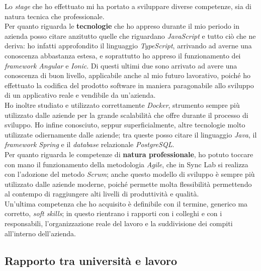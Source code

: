 Lo \textit{stage} che ho effettuato mi ha portato a sviluppare diverse competenze, sia di natura tecnica che professionale. \\
Per quanto riguarda le \textbf{tecnologie} che ho appreso durante il mio periodo in azienda posso citare anzitutto quelle che riguardano \textit{JavaScript} e tutto ciò che ne deriva: ho infatti approfondito il linguaggio \textit{TypeScript}, arrivando ad averne una conoscenza abbastanza estesa, e  soprattutto ho appreso il funzionamento dei \textit{framework Angular} e \textit{Ionic}. Di questi ultimi due sono arrivato ad avere una conoscenza di buon livello, applicabile anche al mio futuro lavorativo, poiché ho effettuato la codifica del prodotto software in maniera paragonabile allo sviluppo di un applicativo reale e vendibile da un'azienda. \\
Ho inoltre studiato e utilizzato correttamente \textit{Docker}, strumento sempre più utilizzato dalle aziende per la grande scalabilità che offre durante il processo di sviluppo. Ho infine conosciuto, seppur superficialmente, altre tecnologie molto utilizzate odiernamente dalle aziende; tra queste posso citare il linguaggio \textit{Java}, il \textit{framework Spring} e il \textit{database} relazionale \textit{PostgreSQL}. \\
Per quanto riguarda le competenze di \textbf{natura professionale}, ho potuto toccare con mano il funzionamento della metodologia \textit{Agile}, che in Sync Lab si realizza con l'adozione del metodo \textit{Scrum}; anche questo modello di sviluppo è sempre più utilizzato dalle aziende moderne, poiché permette molta flessibilità permettendo al contempo di raggiungere alti livelli di produttività e qualità. \\
Un'ultima competenza che ho acquisito è definibile con il termine, generico ma corretto, \textit{soft skills}; in questo rientrano i rapporti con i colleghi e con i responsabili, l'organizzazione reale del lavoro e la suddivisione dei compiti all'interno dell'azienda.


\subsection{Rapporto tra università e lavoro}

